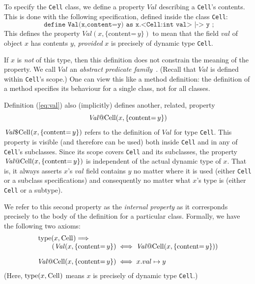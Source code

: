 \documentclass[11pt]{article}
\newcommand{\Val}{\mathit{Val}}
\newcommand{\content}[1]{\{\text{content=} \, #1 \}}
\def\J{\lstinline}
\newcommand{\JS}[1]{$\mathit{#1}$}
\begin{document}
To specify the \J~Cell~ class, we define a property \JS{Val} describing a \J~Cell~'s contents.  This is done with the following 
specification, defined inside the class \J~Cell~:
%
\begin{equation}
\label{eq:val}
\texttt{  define Val(x,content=y) as x.<Cell:int val> |-> y ;}
\end{equation}
%
This defines the property $\Val(x,\content y)$ to mean that the
field \JS{val} of object $x$ has contents $y$, \emph{provided} $x$ is
precisely of dynamic type \J~Cell~.  


If $x$ is \emph{not} of this type,
then this definition does not constrain the meaning of the property. We call
$\Val$ an \emph{abstract predicate family}~\cite{Parkinson:popl05}. (Recall that $\Val$ is defined within \J~Cell~'s scope.)  One can
view this like a method definition: the definition of a method specifies its behaviour for a single class, not for all classes.

Definition (\ref{eq:val}) also (implicitly) defines another, related, property 
\[
\Val\J~@Cell~(x,\content y)
\]
$\Val\$\J~Cell~(x,\content y)$ refers to the definition of $\Val$  for type \J~Cell~. 
This property is visible (and therefore can be used) both inside \J~Cell~ and in any of \J~Cell~'s subclasses.
Since its scope covers  \J~Cell~ and its subclasses, the property $\Val\J~@Cell~(x,\content y)$
is independent of the actual dynamic type of \JS{x}. That is, it always asserts \JS{x}'s
\JS{val} field contains \JS{y} no matter where it is used (either \J~Cell~ or a subclass specifications)
and consequently no matter what \JS{x}'s type is (either \J~Cell~ or a subtype).  

We refer
to this second property as the \emph{internal property} as it
corresponds precisely to the body of the definition for a particular
class. Formally, we have the following two axioms:
\[
\begin{array}{@{}r@{\;}c@{\;}l@{}}
\begin{array}[b]{@{}l@{}}
\J~type~(x, \J~Cell~) \Longrightarrow \\
\mbox{}\qquad(\Val(x,\content y)
\end{array} & \iff & \Val\J~@Cell~(x,\content y))
\\[1em]
\Val\J~@Cell~(x,\content y) &\iff& x.val \mapsto y
\end{array}
\]
(Here, $\J~type~(x, \J~Cell~)$ means $x$ is precisely of dynamic type
\J~Cell~.)
\end{document}
